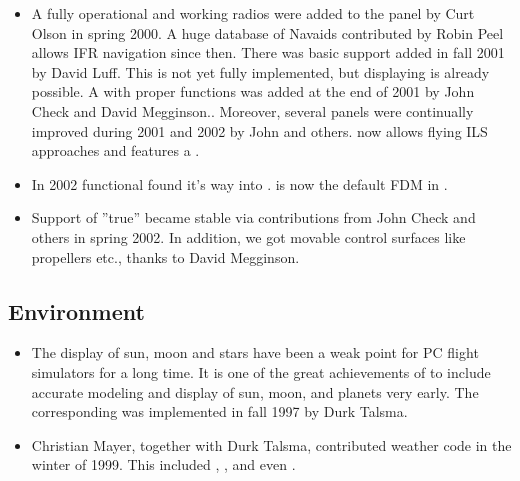 \begin{itemize}
\item A fully operational  and working radios were added to the panel by Curt Olson in spring 2000. A huge database of Navaids contributed by Robin
Peel allows IFR navigation since then. There was basic  support added in fall 2001 by David Luff. This is not yet fully implemented, but displaying  is already possible. A  with proper functions was added at the end of 2001 by John Check and David Megginson.. Moreover, several panels were continually improved during 2001 and 2002 by John and others. \FlightGear{} now allows flying ILS approaches and features a .
\item In 2002 functional  found it's way into
\FlightGear{}. \JSBSim{} is now the default FDM in \FlightGear{}.
\item Support of ''true''  became stable via contributions from John Check and others in spring 2002. In addition, we got movable control surfaces like propellers etc., thanks to David Megginson.
\end{itemize}

\subsection{Environment}
\begin{itemize}
\item The display of sun, moon and stars have been a weak point for PC flight simulators
 for a long time. It is one of the great achievements of \FlightGear{} to include accurate modeling and display of sun, moon, and planets very early. The corresponding  was implemented in fall 1997 by Durk Talsma.
\item Christian Mayer,   together with Durk Talsma,
contributed weather code in the winter of 1999. This included , , and even .
\end{itemize}

